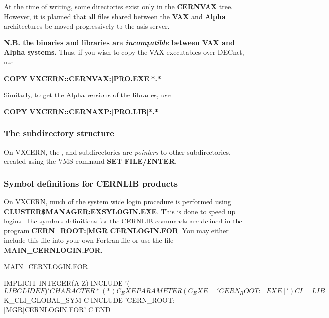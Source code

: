 At the time of writing, some directories exist only in the {\bf CERNVAX} tree.
However, it is planned that all files shared between the {\bf VAX} and {\bf Alpha}
architectures be moved progressively to the asis server.

{\bf N.B. the binaries and libraries are {\it incompatible} between VAX and Alpha
systems.} Thus, if you wish to copy the VAX executables over DECnet, use

{\bf COPY VXCERN::CERNVAX:[PRO.EXE]*.*}

Similarly, to get the Alpha versions of the libraries, use

{\bf COPY VXCERN::CERNAXP:[PRO.LIB]*.*}

\subsubsection{The subdirectory structure}

On VXCERN, the \NEW{}, \PRO{} and \OLD{} subdirectories
are {\it pointers} to other subdirectories, created using the
VMS command {\bf SET FILE/ENTER}.

\subsubsection{Symbol definitions for CERNLIB products}

On VXCERN, much of the system wide login procedure is performed using
{\bf CLUSTER\$MANAGER:EXSYLOGIN.EXE}. This is done to
speed up logins. The symbols definitions for the CERNLIB commands
are defined in the program {\bf CERN\_ROOT:[MGR]CERNLOGIN.FOR}.
You may either include this file into your own Fortran file
or use the file {\bf MAIN\_CERNLOGIN.FOR}.

\begin{XMPt}{MAIN\_CERNLOGIN.FOR}

      IMPLICIT INTEGER(A-Z)
      INCLUDE '($LIBCLIDEF)'
      CHARACTER*(*) C_EXE
      PARAMETER(C_EXE='CERN_ROOT:[EXE]')
C
      I=LIB$K_CLI_GLOBAL_SYM
C
      INCLUDE 'CERN_ROOT:[MGR]CERNLOGIN.FOR'
C 
      END

\end{XMPt}

